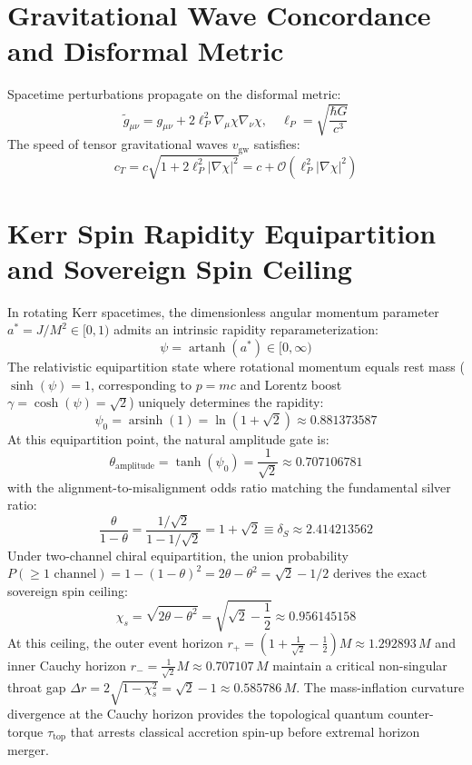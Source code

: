 \documentclass[11pt,a4paper]{article}
\begin{document}
\section{Gravitational Wave Concordance and Disformal Metric}

Spacetime perturbations propagate on the disformal metric:
\begin{equation}
\tilde{g}_{\mu\nu} = g_{\mu\nu} + 2\ell_P^2 \nabla_\mu\chi \nabla_\nu\chi, \quad \ell_P = \sqrt{\frac{\hbar G}{c^3}}
\end{equation}
The speed of tensor gravitational waves $v_{\mathrm{gw}}$ satisfies:
\begin{equation}
c_T = c \sqrt{1 + 2\ell_P^2 |\nabla\chi|^2} = c + \mathcal{O}(\ell_P^2 |\nabla\chi|^2)
\end{equation}
\section{Kerr Spin Rapidity Equipartition and Sovereign Spin Ceiling}

In rotating Kerr spacetimes, the dimensionless angular momentum parameter $a^* = J / M^2 \in [0, 1)$ admits an intrinsic rapidity reparameterization:
\begin{equation}
\psi = \operatorname{artanh}(a^*) \in [0, \infty)
\end{equation}
The relativistic equipartition state where rotational momentum equals rest mass ($\sinh(\psi) = 1$, corresponding to $p = mc$ and Lorentz boost $\gamma = \cosh(\psi) = \sqrt{2}$) uniquely determines the rapidity:
\begin{equation}
\psi_0 = \operatorname{arsinh}(1) = \ln(1 + \sqrt{2}) \approx 0.881373587
\end{equation}
At this equipartition point, the natural amplitude gate is:
\begin{equation}
\theta_{\mathrm{amplitude}} = \tanh(\psi_0) = \frac{1}{\sqrt{2}} \approx 0.707106781
\end{equation}
with the alignment-to-misalignment odds ratio matching the fundamental silver ratio:
\begin{equation}
\frac{\theta}{1 - \theta} = \frac{1/\sqrt{2}}{1 - 1/\sqrt{2}} = 1 + \sqrt{2} \equiv \delta_S \approx 2.414213562
\end{equation}
Under two-channel chiral equipartition, the union probability $P(\ge 1\text{ channel}) = 1 - (1 - \theta)^2 = 2\theta - \theta^2 = \sqrt{2} - 1/2$ derives the exact sovereign spin ceiling:
\begin{equation}
\chi_s = \sqrt{2\theta - \theta^2} = \sqrt{\sqrt{2} - \frac{1}{2}} \approx 0.956145158
\end{equation}
At this ceiling, the outer event horizon $r_+ = (1 + \frac{1}{\sqrt{2}} - \frac{1}{2})M \approx 1.292893\,M$ and inner Cauchy horizon $r_- = \frac{1}{\sqrt{2}}M \approx 0.707107\,M$ maintain a critical non-singular throat gap $\Delta r = 2\sqrt{1 - \chi_s^2} = \sqrt{2} - 1 \approx 0.585786\,M$. The mass-inflation curvature divergence at the Cauchy horizon provides the topological quantum counter-torque $\tau_{\mathrm{top}}$ that arrests classical accretion spin-up before extremal horizon merger.
\end{document}
